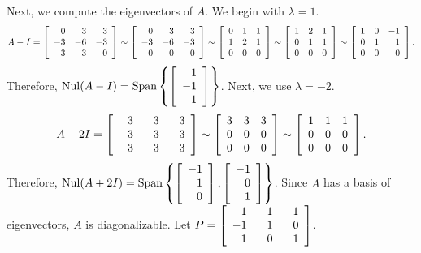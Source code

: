 \begin{Exam}
Next, we compute the eigenvectors of $A$. We begin with $\lambda =1$.
\[A-I =  \mtx{rrr}{0&3&3\\-3&-6&-3\\3&3&0} \sim  \mtx{rrr}{0&3&3\\-3&-6&-3\\0&0&0}\sim  \mtx{rrr}{0&1&1\\1&2&1\\0&0&0} \sim \mtx{rrr}{1&2&1\\0&1&1\\0&0&0}\sim \mtx{rrr}{1&0&-1\\0&1&1\\0&0&0}.\] Therefore, $\nul(A-I) = \Span\left\{\vr{1\\-1\\1}\right\}$. Next, we use $\lambda = -2$.
\[A+2I = \mtx{rrr}{3&3&3\\-3&-3&-3\\3&3&3} \sim \mtx{rrr}{3&3&3\\0&0&0\\0&0&0} \sim \mtx{rrr}{1&1&1\\0&0&0\\0&0&0}.\] Therefore, 
$\nul(A+2I) = \Span\left\{\vr{-1\\1\\0}, \vr{-1\\0\\1}\right\}$. Since $A$ has a basis of eigenvectors, $A$ is diagonalizable. Let $P = \mtx{rrr}{1&-1&-1\\-1&1&0\\1&0&1}$.\\


\end{Exam}
